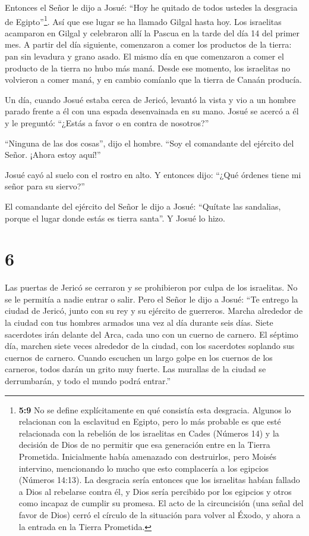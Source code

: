  Entonces el Señor le dijo a Josué: ``Hoy he quitado de
todos ustedes la desgracia de Egipto''\footnote{\textbf{5:9} No se
  define explícitamente en qué consistía esta desgracia. Algunos lo
  relacionan con la esclavitud en Egipto, pero lo más probable es que
  esté relacionada con la rebelión de los israelitas en Cades (Números
  14) y la decisión de Dios de no permitir que esa generación entre en
  la Tierra Prometida. Inicialmente había amenazado con destruirlos,
  pero Moisés intervino, mencionando lo mucho que esto complacería a los
  egipcios (Números 14:13). La desgracia sería entonces que los
  israelitas habían fallado a Dios al rebelarse contra él, y Dios sería
  percibido por los egipcios y otros como incapaz de cumplir su promesa.
  El acto de la circuncisión (una señal del favor de Dios) cerró el
  círculo de la situación para volver al Éxodo, y ahora a la entrada en
  la Tierra Prometida.}. Así que ese lugar se ha llamado Gilgal hasta
hoy.  Los israelitas acamparon en Gilgal y celebraron allí
la Pascua en la tarde del día 14 del primer mes.  A partir
del día siguiente, comenzaron a comer los productos de la tierra: pan
sin levadura y grano asado.  El mismo día en que comenzaron
a comer el producto de la tierra no hubo más maná. Desde ese momento,
los israelitas no volvieron a comer maná, y en cambio comíanlo que la
tierra de Canaán producía.

 Un día, cuando Josué estaba cerca de Jericó, levantó la
vista y vio a un hombre parado frente a él con una espada desenvainada
en su mano. Josué se acercó a él y le preguntó: ``¿Estás a favor o en
contra de nosotros?''

``Ninguna de las dos cosas'', dijo el hombre. ``Soy el comandante del
ejército del Señor. ¡Ahora estoy aquí!''

 Josué cayó al suelo con el rostro en alto. Y entonces
dijo: ``¿Qué órdenes tiene mi señor para su siervo?''

 El comandante del ejército del Señor le dijo a Josué:
``Quítate las sandalias, porque el lugar donde estás es tierra santa''.
Y Josué lo hizo.

\hypertarget{section-5}{%
\section{6}\label{section-5}}

 Las puertas de Jericó se cerraron y se prohibieron por
culpa de los israelitas. No se le permitía a nadie entrar o salir.
 Pero el Señor le dijo a Josué: ``Te entrego la ciudad de
Jericó, junto con su rey y su ejército de guerreros.  Marcha
alrededor de la ciudad con tus hombres armados una vez al día durante
seis días.  Siete sacerdotes irán delante del Arca, cada uno
con un cuerno de carnero. El séptimo día, marchen siete veces alrededor
de la ciudad, con los sacerdotes soplando sus cuernos de carnero.
 Cuando escuchen un largo golpe en los cuernos de los
carneros, todos darán un grito muy fuerte. Las murallas de la ciudad se
derrumbarán, y todo el mundo podrá entrar.''


